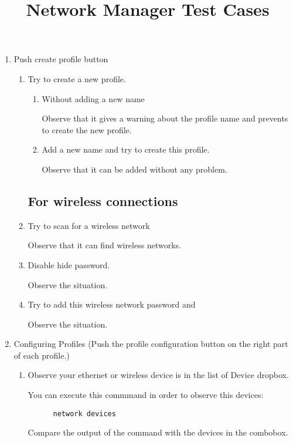 \documentclass[a4paper,10pt]{article}
\title{Network Manager Test Cases}
\begin{document}
\maketitle

\begin{enumerate}
  \item Push create profile button
    \begin{enumerate}
     \subsection*{For ethernet or wireless connections}
	
      \item Try to create a new profile.
	\begin{enumerate}
	  \item  Without adding a new name

		Observe that it gives a warning about the profile name and prevents to create the new profile.
	  \item Add a new name and try to create this profile.

		Observe that it can be added without any problem.
	\end{enumerate}
      
     \subsection*{For wireless connections}
     \item Try to scan for a wireless network
      
	Observe that it can find wireless networks.
     \item Disable hide password.
        
	Observe the situation.
      \item Try to add this wireless network password and 
	
      Observe the situation.
     
     \end{enumerate}
     \item Configuring Profiles (Push the profile configuration button on the right part of each profile.)
    
      \begin{enumerate}
      \item Observe your ethernet or wireless device is in the list of Device dropbox.

	  You can execute this commmand in order to observe this devices:
	  \begin{verbatim}
	  network devices
	  \end{verbatim}
	  Compare the output of the command with the devices in the combobox.


\end{enumerate}
\end{enumerate}
\end{document}
